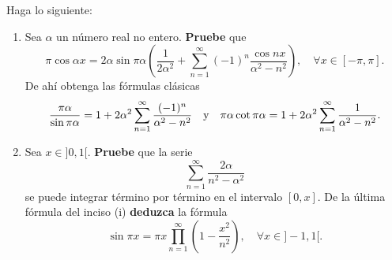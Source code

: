 \documentclass[12pt]{report}
\theoremstyle{largebreak}
\begin{document}
    \begin{excer}
        Haga lo siguiente:
        \begin{enumerate}
            \item Sea $\alpha$ un número real no entero. \textbf{Pruebe} que
            \begin{equation*}
                \pi\cos\alpha x=2\alpha\sin\pi\alpha\left(\frac{1}{2\alpha^2}+\sum_{ n=1}^\infty(-1)^n\frac{\cos nx}{\alpha^2-n^2} \right),\quad\forall x\in[-\pi,\pi].
            \end{equation*}
            De ahí obtenga las fórmulas clásicas
            \begin{equation*}
                \frac{\pi\alpha}{\sin\pi\alpha}=1+2\alpha^2\sum_{ n=1}^\infty\frac{(-1)^n}{\alpha^2-n^2}\quad\textup{y}\quad\pi\alpha\cot\pi\alpha=1+2\alpha^2\sum_{ n=1}^\infty\frac{1}{\alpha^2-n^2}.
            \end{equation*}
            \item Sea $x\in]0,1[$. \textbf{Pruebe} que la serie
            \begin{equation*}
                \sum_{ n=1}^\infty\frac{2\alpha}{n^2-\alpha^2}
            \end{equation*}
            se puede integrar término por término en el intervalo $[0,x]$. De la última fórmula del inciso (i) \textbf{deduzca} la fórmula
            \begin{equation*}
                \sin\pi x=\pi x\prod_{ n=1}^\infty\left(1-\frac{x^2}{n^2} \right),\quad\forall x\in]-1,1[.
            \end{equation*}
        \end{enumerate}
    \end{excer}
\end{document}
